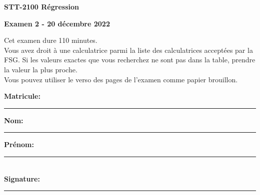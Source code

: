 \documentclass[11pt]{article}
\begin{document}
\begin{center}
{\bf STT-2100 Régression }\\
\end{center}
\begin{center}
{\bf Examen 2 - 20 décembre 2022 }\\
\end{center}


\vspace{0.2 in}
Cet examen dure 110 minutes. \\

Vous avez droit à une calculatrice parmi la liste des calculatrices acceptées par la FSG. Si les valeurs exactes que vous recherchez ne sont pas dans la table, prendre la valeur la plus proche.\\

Vous pouvez utiliser le verso des pages de l'examen comme papier brouillon.

\vspace{0.4 in}

{\bf Matricule:} \quad\rule{2in}{.01in}

\vspace{.5in}

{\bf Nom:}\quad\rule{2in}{.01in}{\bf Prénom:}\quad\rule{2in}{.01in}\\


{\bf Signature:}\quad\rule{3in}{.01in}\\
\end{document}
